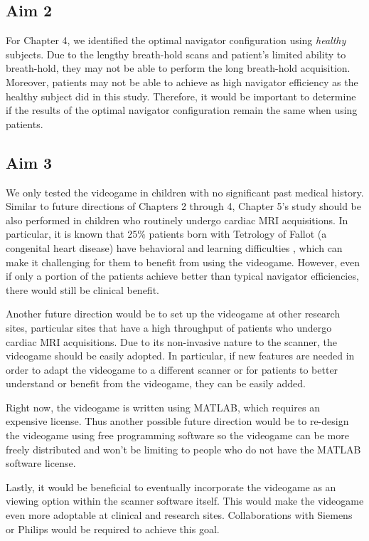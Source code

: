 \subsection{Aim 2}
	For Chapter 4, we identified the optimal navigator configuration using \textit{healthy} subjects. Due to the lengthy breath-hold scans and patient's limited ability to breath-hold, they may not be able to perform the long breath-hold acquisition. Moreover, patients may not be able to achieve as high navigator efficiency as the healthy subject did in this study. Therefore, it would be important to determine if the results of the optimal navigator configuration remain the same when using patients.

\subsection{Aim 3}
	We only tested the videogame in children with no significant past medical history. Similar to future directions of Chapters 2 through 4, Chapter 5's study should be also performed in children who routinely undergo cardiac MRI acquisitions. In particular, it is known that 25\% patients born with Tetrology of Fallot (a congenital heart disease) have behavioral and learning difficulties \cite{Piran2011}, which can make it challenging for them to benefit from using the videogame. However, even if only a portion of the patients achieve better than typical navigator efficiencies, there would still be clinical benefit.
	
	Another future direction would be to set up the videogame at other research sites, particular sites that have a high throughput of patients who undergo cardiac MRI acquisitions. Due to its non-invasive nature to the scanner, the videogame should be easily adopted. In particular, if new features are needed in order to adapt the videogame to a different scanner or for patients to better understand or benefit from the videogame, they can be easily added.
	
	Right now, the videogame is written using MATLAB, which requires an expensive license. Thus another possible future direction would be to re-design the videogame using free programming software so the videogame can be more freely distributed and won't be limiting to people who do not have the MATLAB software license. 
	
	Lastly, it would be beneficial to eventually incorporate the videogame as an viewing option within the scanner software itself. This would make the videogame even more adoptable at clinical and research sites. Collaborations with Siemens or Philips would be required to achieve this goal.
	
	